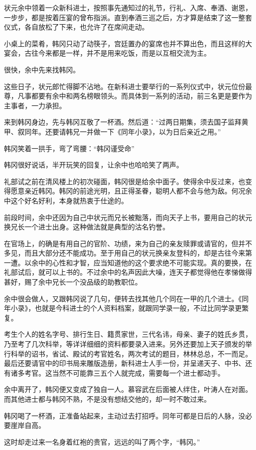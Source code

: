 状元余中领着一众新科进士，按照事先通知过的礼节，行礼、入席、奉酒、谢恩，一步步，都是按着压宴的曾布指派。直到奉酒三巡之后，方才算是结束了这一整套仪式，各自放松了下来，也允许了在席间走动。

小桌上的菜肴，韩冈只动了动筷子，宫廷置办的宴席也并不算出色，而且这样的大宴会，古往今来都是一样，并不是用来吃饭，而是以互相交流为主。

很快，余中先来找韩冈。

这些日子，状元郎忙得脚不沾地。在新科进士要举行的一系列仪式中，状元位份最尊，凡事都要有余中和两名榜眼领头。而具体到一系列的活动，前三名更是要作为主事者，一力承担。

来到韩冈身边，先与韩冈互敬了一杯酒。然后道：“过两日期集，须去国子监拜黄甲、叙同年。还要请韩兄一并做一下《同年小录》，以为日后亲近之用。”

韩冈笑着一拱手，弯了弯腰：“韩冈谨受命”

韩冈很好说话，半开玩笑的回复，让余中也哈哈笑了两声。

礼部试之前在清风楼上的初次碰面，韩冈很是给余中面子。使得余中反过来，也变得愿意亲近韩冈。韩冈的前途光明，且正得圣眷，聪明人都不会与他为敌。何况余中这个好名好利，本身就热衷于仕途的。

前段时间，余中还因为自己中状元而兄长被黜落，而向天子上书，要用自己的状元换兄长一个进士出身。这种做法就是典型的沽名钓誉。

在官场上，的确是有用自己的官阶、功绩，来为自己的亲友赎罪或请官的，但并不多见，而且大部分还不能成功。至于用自己的状元换亲友登科的，却是古往今来第一遭。以余中的心性和才智，应当知道他的这个要求绝不可能实现。真的要换，在礼部试后，就可以上书的。不过余中的名声因此大噪，连天子都觉得他在孝悌做得甚好，赐了余中兄长一个没品级的助教职位。

余中很会做人，又跟韩冈说了几句，便转去找其他几个同在一甲的几个进士。《同年小录》，也就是今科进士的个人资料档案，就跟同学录一般，不过比同学录更繁复。

考生个人的姓名字号、排行生日、籍贯家世，三代名讳，母亲、妻子的姓氏乡贯，乃至考了几次科举，等详详细细的资料都要录入进来。另外还要加上天子颁发的举行科举的诏书，省试、殿试的考官姓名，两次考试的题目，林林总总，不一而足。最后还要请官中的印书局来雕版造册，新科进士人手一份，并呈递天子、中书、还有诸多考官。这当然不可能靠三五个人就完成，需要每一个进士都动手。

余中离开了，韩冈便又变成了独自一人。慕容武在后面被人绊住，叶涛人在对面。而其他进士都与韩冈不熟，不是没有想结交他的，却一时不敢过来。

韩冈喝了一杯酒，正准备站起来，主动过去打招呼。同年可都是日后的人脉，没必要崖岸自高。

这时却走过来一名身着红袍的贵官，远远的叫了两个字，“韩冈。”

